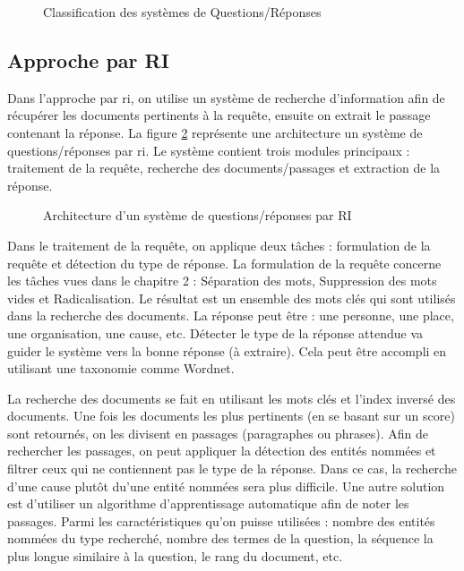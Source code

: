 \documentclass{KodeBook}
\begin{document}
\begin{figure}[!ht]
	\centering
	\caption{Classification des systèmes de Questions/Réponses}
	\label{fig:qr-classif}
\end{figure}

\subsection{Approche par RI}

Dans l'approche par \ac{ri}, on utilise un système de recherche d'information afin de récupérer les documents pertinents à la requête, ensuite on extrait le passage contenant la réponse.
La figure \ref{fig:qa-ri} représente une architecture un système de questions/réponses par \ac{ri}. 
Le système contient trois modules principaux : traitement de la requête, recherche des documents/passages et extraction de la réponse. 

\begin{figure}[!ht]
	\centering
	\caption{Architecture d'un système de questions/réponses par RI \cite{2019-jurafsky-martin}}
	\label{fig:qa-ri}
\end{figure}

Dans le traitement de la requête, on applique deux tâches : formulation de la requête et détection du type de réponse. 
La formulation de la requête concerne les tâches vues dans le chapitre 2 : Séparation des mots, Suppression des mots vides et Radicalisation. 
Le résultat est un ensemble des mots clés qui sont utilisés dans la recherche des documents. 
La réponse peut être : une personne, une place, une organisation, une cause, etc. 
Détecter le type de la réponse attendue va guider le système vers la bonne réponse (à extraire). 
Cela peut être accompli en utilisant une taxonomie comme Wordnet.

La recherche des documents se fait en utilisant les mots clés et l'index inversé des documents. 
Une fois les documents les plus pertinents (en se basant sur un score) sont retournés, on les divisent en passages (paragraphes ou phrases). 
Afin de rechercher les passages, on peut appliquer la détection des entités nommées et filtrer ceux qui ne contiennent pas le type de la réponse.
Dans ce cas, la recherche d'une cause plutôt du'une entité nommées sera plus difficile. 
Une autre solution est d'utiliser un algorithme d'apprentissage automatique afin de noter les passages. 
Parmi les caractéristiques qu'on puisse utilisées : nombre des entités nommées du type recherché, nombre des termes de la question, la séquence la plus longue similaire à la question, le rang du document, etc.
\end{document}
